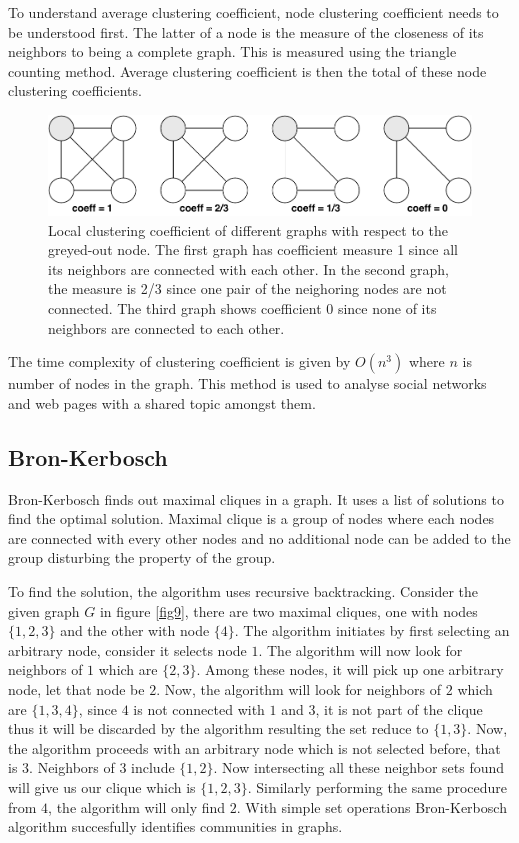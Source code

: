 \documentclass[journal,twoside,web]{ieeecolor}
\begin{document}
To understand average clustering coefficient, node clustering coefficient needs to be understood first. The latter of a node is the measure of the closeness of its neighbors to being a complete graph. This is measured using the triangle counting method. Average clustering coefficient is then the total of these node clustering coefficients.

\begin{figure}[!h]
    \centerline{\includegraphics[scale=0.51]{figures/node_clustering.pdf}}
    \caption{Local clustering coefficient of different graphs with respect to the greyed-out node. The first graph has coefficient measure 1 since all its neighbors are connected with each other. In the second graph, the measure is 2/3 since one pair of the neighoring nodes are not connected. The third graph shows coefficient 0 since none of its neighbors are connected to each other.}
    \label{fig8}
\end{figure}

The time complexity of clustering coefficient is given by $O(n^3)$ where $n$ is number of nodes in the graph. This method is used to analyse social networks and web pages with a shared topic amongst them.

\subsection{Bron-Kerbosch}
Bron-Kerbosch finds out maximal cliques in a graph. It uses a list of solutions to find the optimal solution. Maximal clique is a group of nodes where each nodes are connected with every other nodes and no additional node can be added to the group disturbing the property of the group.

To find the solution, the algorithm uses recursive backtracking. Consider the given graph $G$ in figure \ref{fig9}, there are two maximal cliques, one with nodes $\{1, 2, 3\}$ and the other with node $\{4\}$. The algorithm initiates by first selecting an arbitrary node, consider it selects node $1$. The algorithm will now look for neighbors of $1$ which are $\{2, 3\}$. Among these nodes, it will pick up one arbitrary node, let that node be $2$. Now, the algorithm will look for neighbors of $2$ which are $\{1, 3, 4\}$, since $4$ is not connected with $1$ and $3$, it is not part of the clique thus it will be discarded by the algorithm resulting the set reduce to $\{1, 3\}$. Now, the algorithm proceeds with an arbitrary node which is not selected before, that is $3$. Neighbors of $3$ include $\{1, 2\}$. Now intersecting all these neighbor sets found will give us our clique which is $\{1, 2, 3\}$. Similarly performing the same procedure from $4$, the algorithm will only find $2$. With simple set operations Bron-Kerbosch algorithm succesfully identifies communities in graphs.
\end{document}

